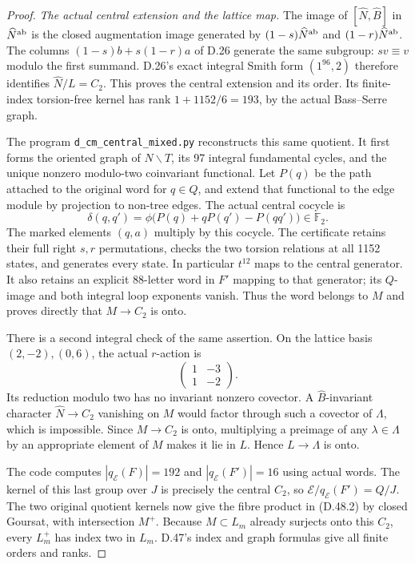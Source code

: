 \begin{proof}
\emph{The actual central extension and the lattice map.}
The image of \([\widehat N,\widehat B]\) in
\(\widehat N^{\rm ab}\) is the closed augmentation image
generated by \((1-s)\widehat N^{\rm ab}\) and
\((1-r)\widehat N^{\rm ab}\). The columns
\((1-s)b+s(1-r)a\) of D.26 generate the same subgroup:
\(s v\equiv v\) modulo the first summand. D.26's exact
integral Smith form \((1^{96},2)\) therefore identifies
\(\widehat N/L=C_2\). This proves the central extension
and its order. Its finite-index torsion-free kernel has
rank \(1+1152/6=193\), by the actual Bass--Serre graph.

The program \texttt{d\_cm\_central\_mixed.py} reconstructs
this same quotient. It first forms the oriented graph of
\(N\backslash T\), its 97 integral fundamental cycles,
and the unique nonzero modulo-two coinvariant functional.
Let \(P(q)\) be the path attached to the original word
for \(q\in Q\), and extend that functional to the edge
module by projection to non-tree edges. The actual central
cocycle is
\[
 \delta(q,q')=\phi\bigl(P(q)+qP(q')-P(qq')\bigr)\in\mathbb F_2.
                                                               \tag{D.48.11}
\]
The marked elements \((q,a)\) multiply by this cocycle.
The certificate retains their full right \(s,r\) permutations,
checks the two torsion relations at all 1152 states, and
generates every state. In particular \(t^{12}\) maps to
the central generator. It also retains an explicit
88-letter word in \(F'\) mapping to that generator;
its \(Q\)-image and both integral loop exponents vanish.
Thus the word belongs to \(M\) and proves directly
that \(M\to C_2\) is onto.

There is a second integral check of the same assertion.
On the lattice basis \((2,-2),(0,6)\), the actual
\(r\)-action is
\[
                   \begin{pmatrix}1&-3\\1&-2\end{pmatrix}.
                                                               \tag{D.48.12}
\]
Its reduction modulo two has no invariant nonzero covector.
A \(\widehat B\)-invariant character
\(\widehat N\to C_2\) vanishing on \(M\) would factor
through such a covector of \(\Lambda\), which is impossible.
Since \(M\to C_2\) is onto, multiplying a preimage of any
\(\lambda\in\Lambda\) by an appropriate element of \(M\)
makes it lie in \(L\). Hence \(L\to\Lambda\) is onto.

The code computes \(|q_{\mathcal E}(F)|=192\) and
\(|q_{\mathcal E}(F')|=16\) using actual words. The kernel
of this last group over \(J\) is precisely the central
\(C_2\), so \(\mathcal E/q_{\mathcal E}(F')=Q/J\).
The two original quotient kernels now give the fibre product
in (D.48.2) by closed Goursat, with intersection \(M^+\).
Because \(M\subset L_m\) already surjects onto this \(C_2\),
every \(L_m^+\) has index two in \(L_m\). D.47's index
and graph formulas give all finite orders and ranks.


\end{proof}
